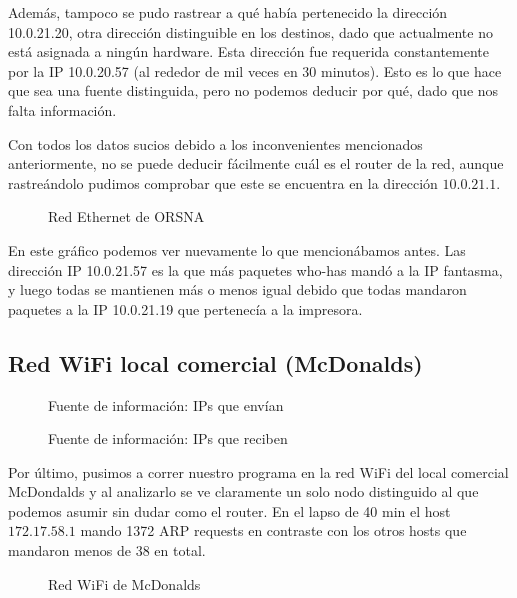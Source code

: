 \documentclass[a4paper, 11pt]{article}
\newcommand{\ponerGrafico}[4]
{\begin{figure}[H]
  \centering
  \subfloat{\hspace{-3.5cm}\texttt{[image: \#1]}}
  \caption{#2} \label{fig:#4}
\end{figure}
}
\begin{document}
Adem\'as, tampoco se pudo rastrear a qu\'e hab\'ia pertenecido la direcci\'on 10.0.21.20, otra direcci\'on distinguible en los destinos, dado que actualmente no est\'a asignada a ning\'un hardware. Esta direcci\'on fue requerida constantemente por la IP 10.0.20.57 (al rededor de mil veces en 30 minutos). Esto es lo que hace que sea una fuente distinguida, pero no podemos deducir por qu\'e, dado que nos falta informaci\'on.

Con todos los datos sucios debido a los inconvenientes mencionados anteriormente, no se puede deducir f\'acilmente  cu\'al es el router de la red, aunque rastre\'andolo pudimos comprobar que este se encuentra en la direcci\'on $10.0.21.1$.

\ponerGrafico{graficos/orsna_grafo.png}{Red Ethernet de ORSNA}{0.5}{label}

En este gr\'afico podemos ver nuevamente lo que mencion\'abamos antes. Las direcci\'on IP 10.0.21.57 es la que m\'as paquetes who-has mand\'o a la IP fantasma, y luego todas se mantienen m\'as o menos igual debido que todas mandaron paquetes a la IP 10.0.21.19 que pertenec\'ia a la impresora.

\subsection{Red WiFi local comercial (McDonalds)}
\ponerGrafico{graficos/mcdonalds_entropia.png}{Fuente de informaci\'on: IPs que env\'ian}{0.5}{label}
\ponerGrafico{graficos/mcdonalds_entropia_rcv.png}{Fuente de informaci\'on: IPs que reciben}{0.5}{label}

Por \'ultimo, pusimos a correr nuestro programa en la red WiFi del local comercial McDondalds y al analizarlo se ve claramente un solo nodo distinguido al que podemos asumir sin dudar como el router. En el lapso de 40 min el host $172.17.58.1$ mando 1372 ARP requests en contraste con los otros hosts que mandaron menos de 38 en total.  

\ponerGrafico{graficos/mcdonalds_grafo.png}{Red WiFi de McDonalds}{0.5}{label}
\end{document}

